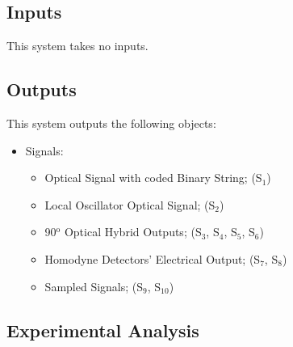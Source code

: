 \subsection*{Inputs}

This system takes no inputs.

\subsection*{Outputs}

This system outputs the following objects:
\begin{itemize}
\item Signals:
\begin{itemize}
\item Optical Signal with coded Binary String; (S$_{1}$)
\item Local Oscillator Optical Signal; (S$_{2}$)
\item 90$^\text{o}$ Optical Hybrid Outputs; (S$_{3}$, S$_{4}$, S$_{5}$, S$_{6}$)
\item Homodyne Detectors' Electrical Output; (S$_{7}$, S$_{8}$)
\item Sampled Signals; (S$_{9}$, S$_{10}$)
\end{itemize}
\end{itemize}


\subsection{Experimental Analysis}

